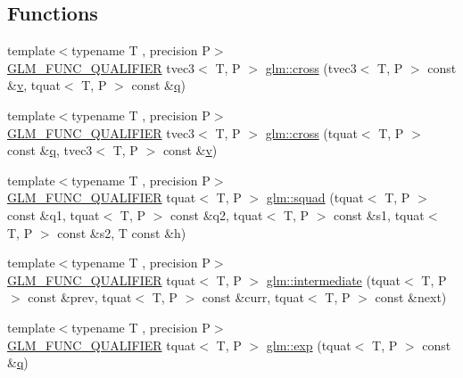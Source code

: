 \subsection*{Functions}
\begin{DoxyCompactItemize}
\item 
{\footnotesize template$<$typename T , precision P$>$ }\\\mbox{\hyperlink{setup_8hpp_a33fdea6f91c5f834105f7415e2a64407}{G\+L\+M\+\_\+\+F\+U\+N\+C\+\_\+\+Q\+U\+A\+L\+I\+F\+I\+ER}} tvec3$<$ T, P $>$ \mbox{\hyperlink{group__gtx__quaternion_ga4bfe3c7770fc43d14b8ef0058c4a86b5}{glm\+::cross}} (tvec3$<$ T, P $>$ const \&\mbox{\hyperlink{glad_8h_a14cfbe2fc2234f5504618905b69d1e06}{v}}, tquat$<$ T, P $>$ const \&\mbox{\hyperlink{glad_8h_a514729309336df22bcc8eda979d6ced4}{q}})
\item 
{\footnotesize template$<$typename T , precision P$>$ }\\\mbox{\hyperlink{setup_8hpp_a33fdea6f91c5f834105f7415e2a64407}{G\+L\+M\+\_\+\+F\+U\+N\+C\+\_\+\+Q\+U\+A\+L\+I\+F\+I\+ER}} tvec3$<$ T, P $>$ \mbox{\hyperlink{group__gtx__quaternion_ga33ecf8ba903eee5fc09f0fbfc0d5ca6b}{glm\+::cross}} (tquat$<$ T, P $>$ const \&\mbox{\hyperlink{glad_8h_a514729309336df22bcc8eda979d6ced4}{q}}, tvec3$<$ T, P $>$ const \&\mbox{\hyperlink{glad_8h_a14cfbe2fc2234f5504618905b69d1e06}{v}})
\item 
{\footnotesize template$<$typename T , precision P$>$ }\\\mbox{\hyperlink{setup_8hpp_a33fdea6f91c5f834105f7415e2a64407}{G\+L\+M\+\_\+\+F\+U\+N\+C\+\_\+\+Q\+U\+A\+L\+I\+F\+I\+ER}} tquat$<$ T, P $>$ \mbox{\hyperlink{group__gtx__quaternion_gae75f537becdf2b1381b4482ec96e6c82}{glm\+::squad}} (tquat$<$ T, P $>$ const \&q1, tquat$<$ T, P $>$ const \&q2, tquat$<$ T, P $>$ const \&s1, tquat$<$ T, P $>$ const \&s2, T const \&h)
\item 
{\footnotesize template$<$typename T , precision P$>$ }\\\mbox{\hyperlink{setup_8hpp_a33fdea6f91c5f834105f7415e2a64407}{G\+L\+M\+\_\+\+F\+U\+N\+C\+\_\+\+Q\+U\+A\+L\+I\+F\+I\+ER}} tquat$<$ T, P $>$ \mbox{\hyperlink{group__gtx__quaternion_ga56abae85b3669c866e91f3c57b298b9c}{glm\+::intermediate}} (tquat$<$ T, P $>$ const \&prev, tquat$<$ T, P $>$ const \&curr, tquat$<$ T, P $>$ const \&next)
\item 
{\footnotesize template$<$typename T , precision P$>$ }\\\mbox{\hyperlink{setup_8hpp_a33fdea6f91c5f834105f7415e2a64407}{G\+L\+M\+\_\+\+F\+U\+N\+C\+\_\+\+Q\+U\+A\+L\+I\+F\+I\+ER}} tquat$<$ T, P $>$ \mbox{\hyperlink{group__gtx__quaternion_ga17295173d4c2b5ae49b84e9993b63a62}{glm\+::exp}} (tquat$<$ T, P $>$ const \&\mbox{\hyperlink{glad_8h_a514729309336df22bcc8eda979d6ced4}{q}})

\end{DoxyCompactItemize}
